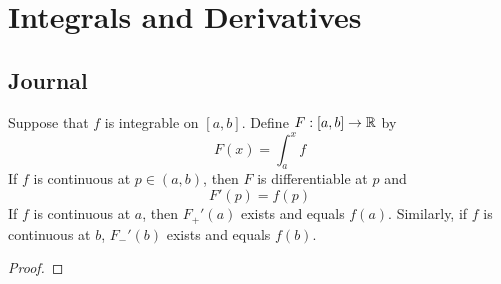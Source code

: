 \documentclass[../main.tex]{subfiles}
\begin{document}
\chapter{Integrals and Derivatives}\label{sct:14}
\section{Journal}
\begin{theorem}
    Suppose that $f$ is integrable on $[a,b]$. Define $F:[a,b]\to\mathbb{R}$ by
    \begin{equation*}
        F(x) = \int_a^xf
    \end{equation*}
    If $f$ is continuous at $p\in(a,b)$, then $F$ is differentiable at $p$ and
    \begin{equation*}
        F'(p) = f(p)
    \end{equation*}
    If $f$ is continuous at $a$, then $F_+'(a)$ exists and equals $f(a)$. Similarly, if $f$ is continuous at $b$, $F_-'(b)$ exists and equals $f(b)$.
    \begin{proof}


\end{proof}
\end{theorem}
\end{document}
